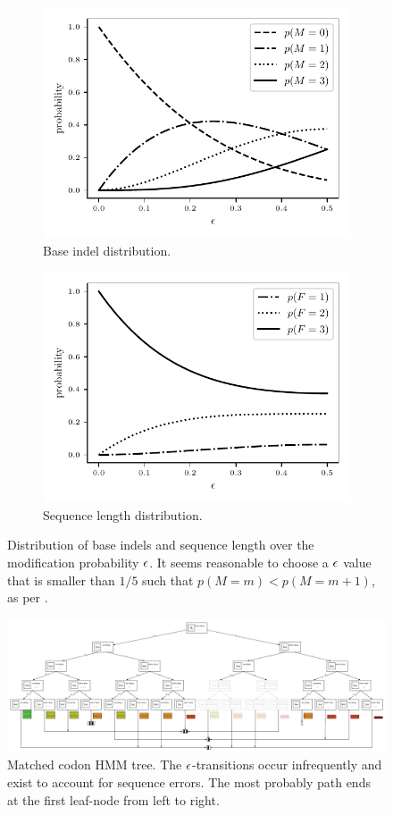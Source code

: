 \begin{figure}[htbp]
  \centering
  \captionsetup{width=0.85\linewidth}
  \begin{subfigure}{.5\linewidth}
    \centering
    \includegraphics[width=.7\linewidth]{figure/indel-prob}
    \caption{Base indel distribution.}\label{fig:indel-dist}
  \end{subfigure}%
  \begin{subfigure}{.5\linewidth}
    \centering
    \includegraphics[width=.7\linewidth]{figure/seq-len-prob}
    \caption{Sequence length distribution.}\label{fig:len-dist}
  \end{subfigure}
  \caption{ Distribution of base indels and sequence length over the modification probability
  $\epsilon$. It seems reasonable to choose a $\epsilon$ value that is smaller than $1/5$ such that
  $p(M=m)<p(M=m+1)$, as per . }\label{fig:dist}
\end{figure}

\newpage
\begin{figure}
    \centering
    \includegraphics[scale=0.9]{figure/codon-hmm-tree}
    \caption{Matched codon HMM tree.
        The $\epsilon$-transitions occur infrequently and exist to account for sequence errors.
        The most probably path ends at the first leaf-node from left to right.}\label{fig:codon-hmm-tree}
\end{figure}
